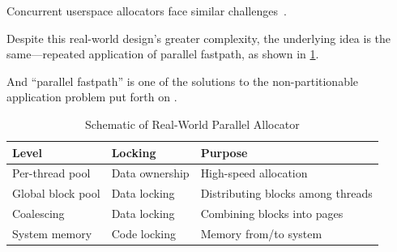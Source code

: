 Concurrent userspace allocators face similar
challenges~\cite{ChrisKennelly2020tcmalloc,JasonEvans2011jemalloc}.

Despite this real-world design's greater complexity, the underlying
idea is the same---repeated application of parallel fastpath,
as shown in
\cref{fig:app:questions:Schematic of Real-World Parallel Allocator}.

And ``parallel fastpath'' is one of the solutions to the non-partitionable
application problem put forth on
.

\begin{table}
\small
\centering
\renewcommand*{\arraystretch}{1.25}
\begin{tabularx}{\twocolumnwidth}{ll>{\raggedright\arraybackslash}X}
\toprule
Level	& Locking & Purpose \\
\midrule
Per-thread pool	  & Data ownership & High-speed allocation \\
Global block pool & Data locking   & Distributing blocks among threads \\
Coalescing	  & Data locking   & Combining blocks into pages \\
System memory	  & Code locking   & Memory from/to system \\
\bottomrule
\end{tabularx}
\caption{Schematic of Real-World Parallel Allocator}
\label{fig:app:questions:Schematic of Real-World Parallel Allocator}
\end{table}



